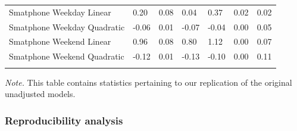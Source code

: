 \documentclass[man]{apa6}
\theoremstyle{definition}
\theoremstyle{definition}
\theoremstyle{definition}
\theoremstyle{remark}
\begin{document}
\begin{table}[tbp]
\begin{center}
\begin{threeparttable}
\begin{tabular}{lllllll}
Smatphone Weekday Linear & 0.20 & 0.08 & 0.04 & 0.37 & 0.02 & 0.02\\
Smatphone Weekday Quadratic & -0.06 & 0.01 & -0.07 & -0.04 & 0.00 & 0.05\\
Smatphone Weekend Linear & 0.96 & 0.08 & 0.80 & 1.12 & 0.00 & 0.07\\
Smatphone Weekend Quadratic & -0.12 & 0.01 & -0.13 & -0.10 & 0.00 & 0.11\\
\bottomrule
\addlinespace
\end{tabular}
\begin{tablenotes}[para]
\textit{Note.} This table contains statistics pertaining to our replication of the original unadjusted models.
\end{tablenotes}
\end{threeparttable}
\end{center}
\end{table}

\hypertarget{reproducibility-analysis}{%
\subsubsection{Reproducibility
analysis}\label{reproducibility-analysis}}
\end{document}
